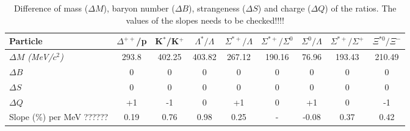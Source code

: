 \vspace{6pt}
 \begin{center}
\begin{table}[!htb] 
\caption{\label{diff} Difference of mass ($\Delta M$), baryon number ($\Delta B$), strangeness ($\Delta S$) and charge ($\Delta Q$) of the ratios. The values of the slopes needs to be checked!!!!}
\centering
 \begin{tabular}{lcccccccc}
 	 		\hline
\hline
Particle&$\Delta^{++}$/p & K$^{*}$/K$^{+}$& $\Lambda^{*}/\Lambda$&$\Sigma^{*+}/\Lambda$  &$\Sigma^{*+}/\Sigma^{0}$ &$\Sigma^{0}/\Lambda$ & $\Sigma^{*+}/\Sigma^{+}$ & $\Xi^{*0}/\Xi^{-}$\\
\hline
\textit{$\Delta M$ ({\rm MeV}/$c^{2}$)}&293.8&402.25&403.82&267.12&190.16&76.96&193.43&210.49\\
\textit{$\Delta B$}&0&0&0&0&0&0&0&0\\
\textit{$\Delta S$}&0&0&0&0&0&0&0&0\\
\textit{$\Delta Q$}&+1&-1&0&+1&0&+1&0&-1\\
\hline
Slope (\%) per MeV ??????& 0.19 &0.76& 0.98& 0.25 & - & -0.08 &0.37 &0.42\\
 \hline
\end{tabular}
\end{table}
\end{center}

